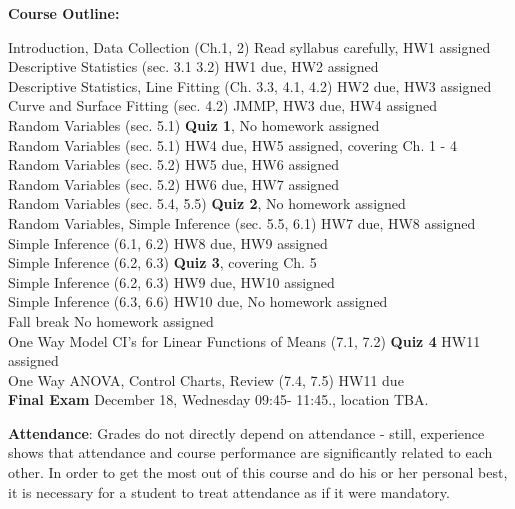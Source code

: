 \documentclass[12pt]{article}\usepackage[]{graphicx}\usepackage[]{color}
\begin{document}
\noindent\textbf{Course Outline:} 
\begin{center} \begin{minipage}{6.5in}
\begin{flushleft}
Introduction, Data Collection (Ch.1, 2) \dotfill Read syllabus carefully, HW1 assigned\\
Descriptive Statistics (sec. 3.1 3.2)  \dotfill HW1 due, HW2 assigned\\
Descriptive Statistics, Line Fitting  (Ch. 3.3, 4.1, 4.2) \dotfill HW2 due, HW3 assigned\\
Curve and Surface Fitting (sec. 4.2) \dotfill JMMP, HW3 due, HW4 assigned \\
Random Variables (sec. 5.1) \dotfill \textbf{Quiz 1}, No homework assigned\\
Random Variables (sec. 5.1) \dotfill HW4 due, HW5 assigned, covering Ch. 1 - 4 \\
Random Variables (sec. 5.2) \dotfill HW5 due, HW6 assigned  \\
Random Variables (sec. 5.2) \dotfill HW6 due, HW7 assigned  \\
Random Variables (sec. 5.4, 5.5) \dotfill \textbf{Quiz 2}, No homework assigned\\
Random Variables, Simple Inference (sec. 5.5, 6.1) \dotfill HW7 due, HW8 assigned \\
Simple Inference (6.1, 6.2) \dotfill HW8 due, HW9 assigned  \\
Simple Inference (6.2, 6.3) \dotfill \textbf{Quiz 3}, covering Ch. 5 \\
Simple Inference (6.2, 6.3) \dotfill HW9 due, HW10 assigned  \\
Simple Inference (6.3, 6.6) \dotfill HW10 due, No homework assigned\\
Fall  break \dotfill No homework assigned \\
One Way Model CI's for Linear Functions of Means (7.1, 7.2) \dotfill \textbf{Quiz 4} HW11 assigned  \\
One Way ANOVA, Control Charts, Review (7.4, 7.5) \dotfill HW11 due \\
\textbf{Final Exam} \dotfill  December 18, Wednesday 09:45- 11:45., location TBA.
\end{flushleft}
\end{minipage}
\end{center}

\noindent\textbf{Attendance}:  
Grades do not directly depend on attendance - still, experience shows that attendance and course performance are significantly related to each other. In order to get the most out of this course and do his or her personal best, it is necessary for a student to treat attendance as if it were mandatory.
\end{document}
